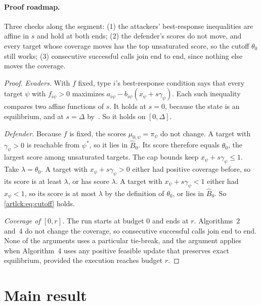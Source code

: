 \paragraph{Proof roadmap.} Three checks along the segment: (1) the attackers' best-response
inequalities are affine in $s$ and hold at both ends; (2) the defender's scores do not move, and every
target whose coverage moves has the top unsaturated score, so the cutoff $\theta_0$ still works; (3)
consecutive successful calls join end to end, since nothing else moves the coverage.

\begin{proof}
\emph{Evaders.} With $f$ fixed, type $i$'s best-response condition says that every target $\psi$ with
$f_{i\psi}>0$ maximizes $a_{i\psi}-b_{i\psi}(x_\psi+s\gamma_\psi)$. Each such inequality compares two
affine functions of $s$. It holds at $s=0$, because the state is an equilibrium, and at $s=\Delta$
by~\cite[Lemma~4]{lck16}. So it holds on $[0,\Delta]$.

\emph{Defender.} Because $f$ is fixed, the scores $\mu_{0,\psi}=\pi_\psi$ do not change. A target with
$\gamma_\psi>0$ is reachable from $\psi^*$, so it lies in $\hat B_0$. Its score therefore equals
$\theta_0$, the largest score among unsaturated targets. The cap bounds keep $x_\psi+s\gamma_\psi\le1$.
Take $\lambda=\theta_0$. A target with $x_\psi+s\gamma_\psi>0$ either had positive coverage before, so
its score is at least $\lambda$, or has score $\lambda$. A target with $x_\psi+s\gamma_\psi<1$ either had
$x_\psi<1$, so its score is at most $\lambda$ by the definition of $\theta_0$, or lies in $\hat B_0$. So
\eqref{artlck:eq:cutoff} holds.

\emph{Coverage of $[0,r]$.} The run starts at budget $0$ and ends at $r$. Algorithms~2 and~4 do not
change the coverage, so consecutive successful calls join end to end. None of the arguments uses a
particular tie-break, and the argument applies when Algorithm~4 uses any positive feasible update
that preserves exact equilibrium, provided the execution reaches budget $r$.
\end{proof}

\section{Main result}\label{artlck:sec:main}

